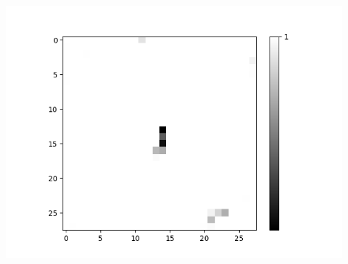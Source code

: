 \begin{figure}[H]
\begin{minipage}[b]{0.19\textwidth}
		\includegraphics[width=\textwidth]{OR-AND(OLD)(WO-LSM)(1)/Layer0-Neuron-23.png}
		\label{}
	\end{minipage}
	\caption{}
	\hfill
\end{figure}

